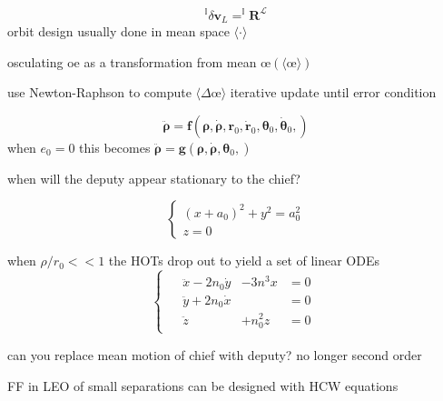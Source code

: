 
% 

$$^\mathbb{I}{\delta\mathbf{v}_L} = ^\mathbb{I}{\mathbf{R}}^\mathcal{L}$$
orbit design usually done in mean space $\langle\cdot\rangle$

osculating oe as a transformation from mean
$\textbf{\oe}(\langle\textbf{\oe}\rangle)$

use Newton-Raphson to compute $\langle\Delta\textbf{\oe}\rangle$ iterative update until error condition

$$\ddot{\mathbf{\rho}} = 
\mathbf{f}
(\mathbf{\rho}, \dot{\mathbf{\rho}}, \mathbf{r}_0, \dot{\mathbf{r}}_0, \mathbf{\theta}_0, \dot{\mathbf{\theta}}_0,)
$$
when $e_0=0$ this becomes $\ddot{\mathbf{\rho}} = 
\mathbf{g}(\mathbf{\rho}, \dot{\mathbf{\rho}}, \mathbf{\theta}_0,)$

when will the deputy appear stationary to the chief?

\[
	\begin{cases}
    	(x+a_0)^2 + y^2 = a_0^2\\z=0
    \end{cases}
\]

when $\rho/r_0 <<1$ the HOTs drop out to yield a set of linear ODEs
\[
	\begin{cases}
    \begin{aligned}
    	&\ddot{x}-2n_0\dot{y} &-3n^3x &=0\\
        &\ddot{y}+2n_0\dot{x} &       &=0\\
        &\ddot{z}&+n_0^2z             &=0
    \end{aligned}
    \end{cases}
\]

can you replace mean motion of chief with deputy? no longer second order

FF in LEO of small separations can be designed with HCW equations

% 